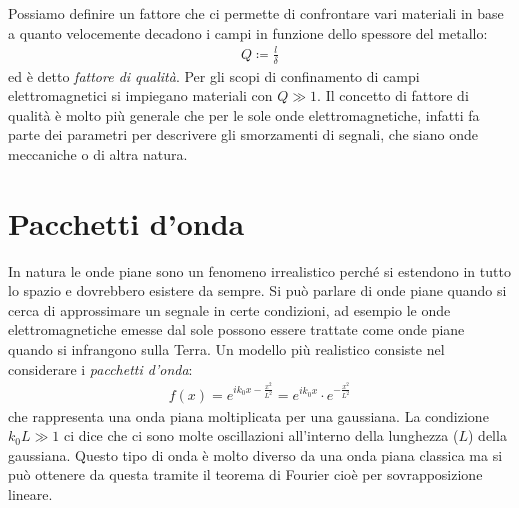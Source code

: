Possiamo definire un fattore che ci permette di confrontare vari materiali in base a quanto velocemente decadono i campi in funzione dello spessore del 
metallo:
\begin{align}
  Q \coloneqq \frac{l}{\delta} 
\end{align}
ed è detto \textit{fattore di qualità}. Per gli scopi di confinamento di campi elettromagnetici si impiegano materiali con $ Q \gg 1 $. Il concetto di 
fattore di qualità è molto più generale che per le sole onde elettromagnetiche, infatti fa parte dei parametri per descrivere gli smorzamenti di segnali, 
che siano onde meccaniche o di altra natura.

\section{Pacchetti d'onda}
In natura le onde piane sono un fenomeno irrealistico perché si estendono in tutto lo spazio e dovrebbero esistere da sempre. Si può parlare di onde piane 
quando si cerca di approssimare un segnale in certe condizioni, ad esempio le onde elettromagnetiche emesse dal sole possono essere trattate come onde 
piane quando si infrangono sulla Terra. Un modello più realistico consiste nel considerare i \textit{pacchetti d'onda}:
\begin{align}
  f(x) = e^{i k_0 x - \frac{x^2}{L^2}} = e^{i k_0 x} \cdot e^{- \frac{x^2}{L^2}}
\end{align}
che rappresenta una onda piana moltiplicata per una gaussiana. La condizione $ k_0 L \gg 1 $ ci dice che ci sono molte oscillazioni all'interno della 
lunghezza ($ L $) della gaussiana. Questo tipo di onda è molto diverso da una onda piana classica ma si può ottenere da questa tramite il teorema di Fourier 
cioè per sovrapposizione lineare.


